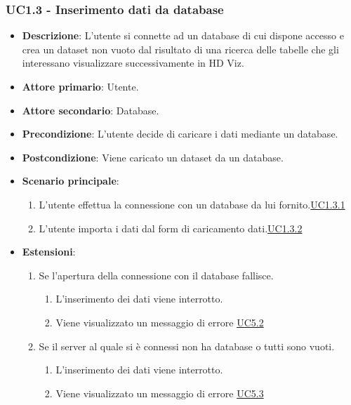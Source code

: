 \subsubsection{UC1.3 - Inserimento dati da database}
\label{ssub:uc1.3}
\begin{itemize}
    \item \textbf{Descrizione}: L'utente si connette ad un database di cui dispone accesso e 
                                crea un dataset non vuoto dal risultato di una ricerca delle tabelle che gli interessano
                                visualizzare successivamente in HD Viz.
    \item \textbf{Attore primario}: Utente.
    
    \item \textbf{Attore secondario}: Database.
    
    \item \textbf{Precondizione}:   L'utente decide di caricare i dati mediante un database. 
    \item \textbf{Postcondizione}:  Viene caricato un dataset da un database. 

	\item \textbf{Scenario principale}:
		\begin{enumerate}
			\item L'utente effettua la connessione con un database da lui fornito.\hyperref[par:uc1.3.1]{UC1.3.1}
			\item L'utente importa i dati dal form di caricamento dati.\hyperref[par:uc1.3.2]{UC1.3.2} 
        \end{enumerate}

    \item \textbf{Estensioni}:
    \begin{enumerate}
        \item Se l'apertura della connessione con il database fallisce.
        \begin{enumerate}
            \item L'inserimento dei dati viene interrotto.
            \item Viene visualizzato un messaggio di errore \hyperref[ssub:uc5.2]{UC5.2}
        \end{enumerate}

        \item Se il server al quale si è connessi non ha database o tutti sono vuoti.
        \begin{enumerate}
            \item L'inserimento dei dati viene interrotto.
            \item Viene visualizzato un messaggio di errore \hyperref[ssub:uc5.3]{UC5.3}
        \end{enumerate}


\end{enumerate}
\end{itemize}
